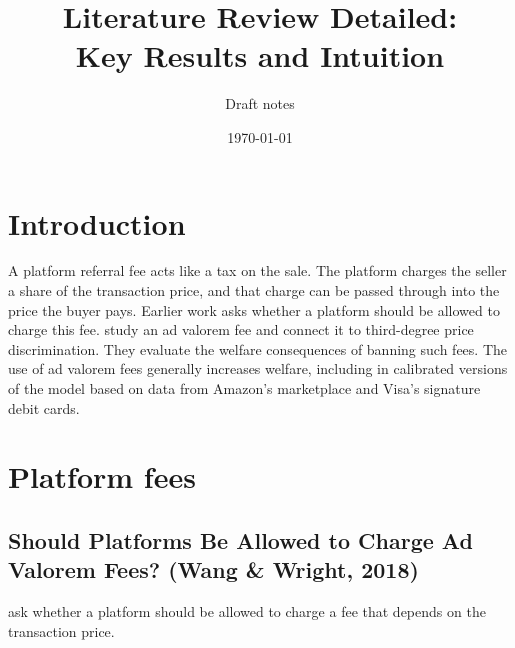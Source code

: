 \documentclass[11pt]{article}
\title{Literature Review Detailed:\\
Key Results and Intuition}
\author{Draft notes}
\date{\today}
\begin{document}
\maketitle

\section{Introduction}

A platform referral fee acts like a tax on the sale.  The platform charges
the seller a share of the transaction price, and that charge can be passed
through into the price the buyer pays.  Earlier work asks whether a platform
should be allowed to charge this fee.  \citet{wang_advalorem_2018} study an
ad valorem fee and connect it to third-degree price discrimination.  They
evaluate the welfare consequences of banning such fees.  The use of ad
valorem fees generally increases welfare, including in calibrated versions of
the model based on data from Amazon's marketplace and Visa's signature debit
cards.

\section{Platform fees}

\subsection{Should Platforms Be Allowed to Charge Ad Valorem Fees? (Wang \& Wright, 2018)}

\citet{wang_advalorem_2018} ask whether a platform should be allowed to charge
a fee that depends on the transaction price.
\end{document}
